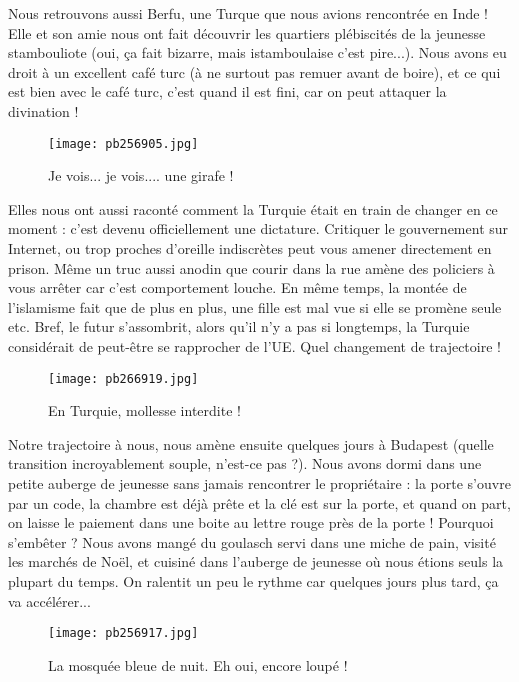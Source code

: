 \documentclass{book}
\begin{document}
Nous retrouvons aussi Berfu, une Turque que nous avions rencontrée en Inde ! Elle et son amie nous ont fait découvrir les quartiers plébiscités de la jeunesse stambouliote (oui, ça fait bizarre, mais istamboulaise c'est pire...). Nous avons eu droit à un excellent café turc (à ne surtout pas remuer avant de boire), et ce qui est bien avec le café turc, c'est quand il est fini, car on peut attaquer la divination !


\begin{figure}[h]
\centering
\texttt{[image: pb256905.jpg]}
\caption*{Je vois... je vois.... une girafe !}
\end{figure}

Elles nous ont aussi raconté comment la Turquie était en train de changer en ce moment : c'est devenu officiellement une dictature. Critiquer le gouvernement sur Internet, ou trop proches d'oreille indiscrètes peut vous amener directement en prison. Même un truc aussi anodin que courir dans la rue amène des policiers à vous arrêter car c'est comportement louche. En même temps, la montée de l'islamisme fait que de plus en plus, une fille est mal vue si elle se promène seule etc. Bref, le futur s’assombrit, alors qu'il n'y a pas si longtemps, la Turquie considérait de peut-être se rapprocher de l'UE. Quel changement de trajectoire !


\begin{figure}[h]
\centering
\texttt{[image: pb266919.jpg]}
\caption*{En Turquie, mollesse interdite !}
\end{figure}

Notre trajectoire à nous, nous amène ensuite quelques jours à Budapest (quelle transition incroyablement souple, n'est-ce pas ?). Nous avons dormi dans une petite auberge de jeunesse sans jamais rencontrer le propriétaire : la porte s'ouvre par un code, la chambre est déjà prête et la clé est sur la porte, et quand on part, on laisse le paiement dans une boite au lettre rouge près de la porte ! Pourquoi s'embêter ? Nous avons mangé du goulasch servi dans une miche de pain, visité les marchés de Noël, et cuisiné dans l'auberge de jeunesse où nous étions seuls la plupart du temps. On ralentit un peu le rythme car quelques jours plus tard, ça va accélérer...


\begin{figure}[h]
\centering
\texttt{[image: pb256917.jpg]}
\caption*{La mosquée bleue de nuit. Eh oui, encore loupé !}
\end{figure}
\end{document}
